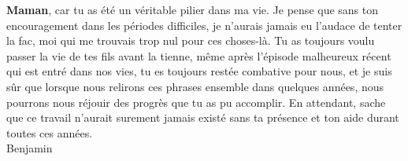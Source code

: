 \textbf{Maman}, car tu as été un véritable pilier dans ma vie. Je pense que sans ton encouragement dans les périodes difficiles, je n’aurais jamais eu l’audace de tenter la fac, moi qui me trouvais trop nul pour ces choses-là. Tu as toujours voulu passer la vie de tes fils avant la tienne, même après l’épisode malheureux récent qui est entré dans nos vies, tu es toujours restée combative pour nous, et je suis sûr que lorsque nous relirons ces phrases ensemble dans quelques années, nous pourrons nous réjouir des progrès que tu as pu accomplir. En attendant, sache que ce travail n'aurait surement jamais existé sans ta présence et ton aide durant toutes ces années.\\

\null\hfill Benjamin
